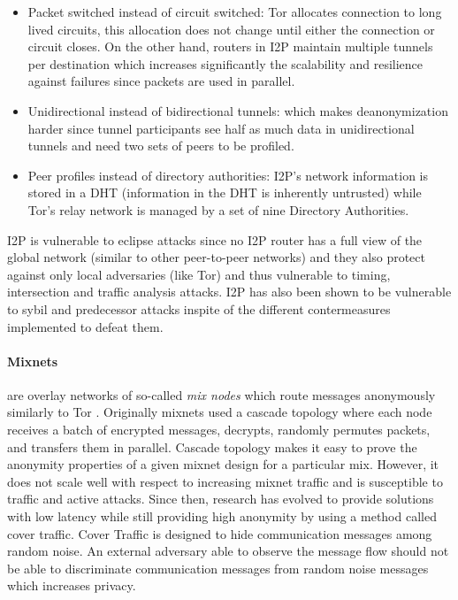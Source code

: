 \begin{itemize}

    \item Packet switched instead of circuit switched: Tor allocates connection
        to long lived circuits, this allocation does not change until either the
        connection or circuit closes. On the other hand, routers in I2P maintain
        multiple tunnels per destination which increases significantly the
        scalability and resilience against failures since packets are used in
        parallel.

    \item Unidirectional instead of bidirectional tunnels: which makes
        deanonymization harder since tunnel participants see half as much data
        in unidirectional tunnels and need two sets of peers to be profiled.

    \item Peer profiles instead of directory authorities: I2P’s network
        information is stored in a DHT (information in the DHT is inherently
        untrusted) while Tor’s relay network is managed by a set of nine
        Directory Authorities.

\end{itemize}

I2P is vulnerable to eclipse attacks since no I2P router has a full view of the
global network (similar to other peer-to-peer networks) and they also protect
against only local adversaries (like Tor) and thus vulnerable to timing,
intersection and traffic analysis attacks. I2P has also been shown to be vulnerable
to sybil and predecessor attacks inspite of the different contermeasures
implemented to defeat them.

\paragraph{Mixnets} are overlay networks of so-called \textit{mix nodes} which
route messages anonymously similarly to Tor \cite{mixnets}. Originally mixnets
used a cascade topology where each node receives a batch of encrypted messages,
decrypts, randomly permutes packets, and transfers them in parallel. Cascade
topology makes it easy to prove the anonymity properties of a given mixnet
design for a particular mix. However, it does not scale well with respect to
increasing mixnet traffic and is susceptible to traffic and active attacks.
Since then, research has evolved to provide solutions with low latency while
still providing high anonymity by using a method called cover traffic. Cover
Traffic is designed to hide communication messages among random noise. An
external adversary able to observe the message flow should not be able to
discriminate communication messages from random noise messages which increases
privacy.

